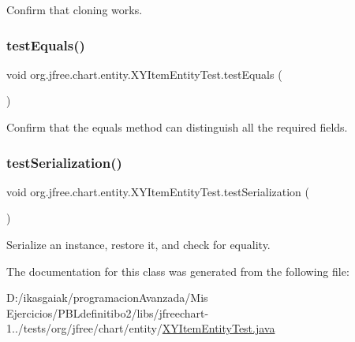 Confirm that cloning works. \mbox{\label{classorg_1_1jfree_1_1chart_1_1entity_1_1_x_y_item_entity_test_a57a4c5dfe99882cd3f3214bdb2b5839f}} 
\subsubsection{\texorpdfstring{test\+Equals()}{testEquals()}}
{\footnotesize\ttfamily void org.\+jfree.\+chart.\+entity.\+X\+Y\+Item\+Entity\+Test.\+test\+Equals (\begin{DoxyParamCaption}{ }\end{DoxyParamCaption})}

Confirm that the equals method can distinguish all the required fields. \mbox{\label{classorg_1_1jfree_1_1chart_1_1entity_1_1_x_y_item_entity_test_ac2d2d611185a28f0dca2b21195e63c44}} 
\subsubsection{\texorpdfstring{test\+Serialization()}{testSerialization()}}
{\footnotesize\ttfamily void org.\+jfree.\+chart.\+entity.\+X\+Y\+Item\+Entity\+Test.\+test\+Serialization (\begin{DoxyParamCaption}{ }\end{DoxyParamCaption})}

Serialize an instance, restore it, and check for equality. 

The documentation for this class was generated from the following file\+:\begin{DoxyCompactItemize}
\item 
D\+:/ikasgaiak/programacion\+Avanzada/\+Mis Ejercicios/\+P\+B\+Ldefinitibo2/libs/jfreechart-\/1../tests/org/jfree/chart/entity/\mbox{\hyperlink{_x_y_item_entity_test_8java}{X\+Y\+Item\+Entity\+Test.\+java}}\end{DoxyCompactItemize}
